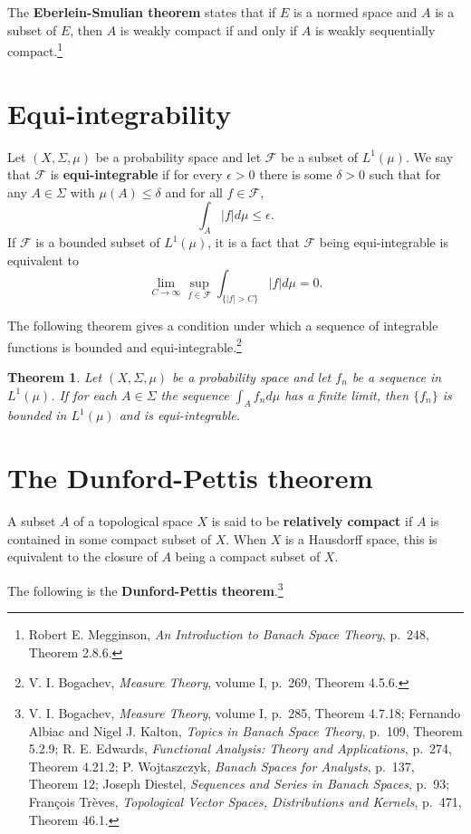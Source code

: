 \documentclass{article}
\newtheorem{theorem}{Theorem}
\theoremstyle{definition}
\begin{document}
The \textbf{Eberlein-Smulian theorem} states that if $E$ is a normed space and $A$ is a subset of $E$, then $A$ is weakly
compact if and only if $A$ is weakly sequentially compact.\footnote{Robert E. Megginson, {\em An Introduction to Banach
Space Theory}, p.~248, Theorem 2.8.6.}


\section{Equi-integrability}
Let $(X,\Sigma,\mu)$ be a probability space and let $\mathscr{F}$ be a subset of $L^1(\mu)$. We say that $\mathscr{F}$
is \textbf{equi-integrable} if for every $\epsilon>0$ there is some $\delta>0$ such that for any
$A \in \Sigma$ with $\mu(A) \leq \delta$ and for all $f \in \mathscr{F}$,
\[
\int_A |f| d\mu \leq \epsilon.
\]
If $\mathscr{F}$ is a bounded subset of $L^1(\mu)$, it is a fact that $\mathscr{F}$ being equi-integrable is equivalent to 
\begin{equation}
\lim_{C \to \infty} \sup_{f \in \mathscr{F}} \int_{\{|f|>C\}} |f| d\mu  = 0.
\label{Climit}
\end{equation}

The following theorem gives a condition under which a sequence of integrable functions is bounded and
equi-integrable.\footnote{V. I. Bogachev, {\em Measure Theory}, volume I, p.~269, Theorem 4.5.6.}

\begin{theorem}
Let $(X,\Sigma,\mu)$ be a probability space and let $f_n$ be a sequence in $L^1(\mu)$. If for each $A \in \Sigma$ the
sequence $\int_A f_n d\mu$ has a finite limit, then $\{f_n\}$ is bounded in $L^1(\mu)$ and is equi-integrable.
\label{Alimit}
\end{theorem}


\section{The Dunford-Pettis theorem}
A subset $A$ of a topological space $X$ is said to be \textbf{relatively compact} if $A$ is contained in some compact subset of $X$. When $X$ is a Hausdorff
space, this is equivalent to the closure of $A$ being a compact subset of $X$. 


The following is the \textbf{Dunford-Pettis theorem}.\footnote{V. I. Bogachev, {\em Measure Theory}, volume I,
p.~285, Theorem 4.7.18; Fernando Albiac and
Nigel J. Kalton, {\em Topics in Banach Space Theory}, p.~109, Theorem 5.2.9;
R. E. Edwards, {\em Functional Analysis: Theory and Applications}, p.~274, Theorem 4.21.2;
P. Wojtaszczyk, {\em Banach Spaces for Analysts},
p.~137, Theorem 12; Joseph Diestel, {\em Sequences and Series in Banach Spaces}, p.~93; Fran\c{c}ois Tr\`eves, {\em Topological Vector Spaces, Distributions and Kernels}, p.~471, Theorem 46.1.}
\end{document}
